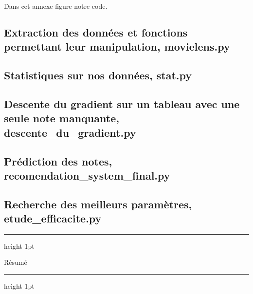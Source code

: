 \documentclass[a4paper,10pt]{article}
\newenvironment{changemargin}[2]{\begin{list}{}{%
\setlength{\topsep}{0pt}%
\setlength{\leftmargin}{0pt}%
\setlength{\rightmargin}{0pt}%
\setlength{\listparindent}{\parindent}%
\setlength{\itemindent}{\parindent}%
\setlength{\parsep}{0pt plus 1pt}%
\addtolength{\leftmargin}{#1}%
\addtolength{\rightmargin}{#2}%
}\item }{\end{list}}
\begin{document}
Dans cet annexe figure notre code. 
 
\subsection{Extraction des données et fonctions permettant leur manipulation, movielens.py} 
\begin{changemargin}{-4cm}{0cm} 
 
\end{changemargin} 
 
\subsection{Statistiques sur nos données, stat.py} 
\begin{changemargin}{-4cm}{0cm} 
 
\end{changemargin} 
 
\subsection{Descente du gradient sur un tableau avec une seule note manquante, descente\_du\_gradient.py} 
\begin{changemargin}{-4cm}{0cm} 
 
\end{changemargin} 
 
\subsection{Prédiction des notes, recomendation\_system\_final.py} 
\begin{changemargin}{-4cm}{0cm} 
 
\end{changemargin} 
 
\subsection{Recherche des meilleurs paramètres, etude\_efficacite.py} 
\begin{changemargin}{-4cm}{0cm} 
 
\end{changemargin}

\newpage

\hrule height 1pt
\begin{center}
\begin{Large}Résumé\end{Large}
\end{center}
\hrule height 1pt
\vskip 1cm
\end{document}
